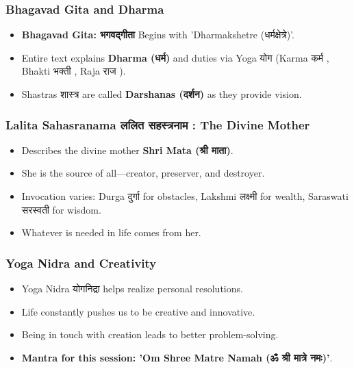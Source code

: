 \begin{frame}[fragile]\frametitle{Bhagavad Gita and Dharma}
      \begin{itemize}
        \item \textbf{Bhagavad Gita: भगवद्गीता } Begins with 'Dharmakshetre (धर्मक्षेत्रे)'.
        \item Entire text explains \textbf{Dharma (धर्म)} and duties via Yoga योग  (Karma कर्म , Bhakti भक्ती , Raja राज ).
        \item Shastras शास्त्र are called \textbf{Darshanas (दर्शन)} as they provide vision.
      \end{itemize}
\end{frame}

\begin{frame}[fragile]\frametitle{Lalita Sahasranama ललित सहस्त्रनाम : The Divine Mother}
      \begin{itemize}
        \item Describes the divine mother \textbf{Shri Mata (श्री माता)}.
        \item She is the source of all—creator, preserver, and destroyer.
        \item Invocation varies: Durga दुर्गा for obstacles, Lakshmi लक्ष्मी for wealth, Saraswati सरस्वती for wisdom.
        \item Whatever is needed in life comes from her.
      \end{itemize}
\end{frame}

\begin{frame}[fragile]\frametitle{Yoga Nidra and Creativity}
      \begin{itemize}
        \item Yoga Nidra योगनिद्रा helps realize personal resolutions.
        \item Life constantly pushes us to be creative and innovative.
        \item Being in touch with creation leads to better problem-solving.
        \item \textbf{Mantra for this session: 'Om Shree Matre Namah (ॐ श्री मात्रे नमः)'}.
      \end{itemize}
\end{frame}

